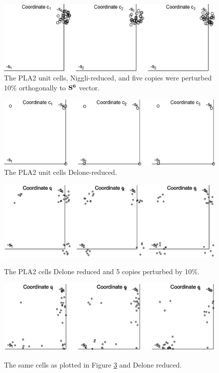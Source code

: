 \documentclass[]{iucr}              %
\numberwithin{equation}{section}
\newcommand{\SVI}[0]{$\bf{S^{6}}$}
\begin{document}
\begin{figure}
	\includegraphics[width=1.0\textwidth]{5_21}
	\caption{The PLA2 unit cells, Niggli-reduced, and five copies were perturbed 10\%
		orthogonally to \SVI{} vector. }
	\label{fig5}	
\end{figure}

	\begin{figure}
		\includegraphics[width=1.0\textwidth]{3_03}
		\caption{The PLA2 unit cells Delone-reduced. }
		\label{fig3}
	\end{figure}
	
	\begin{figure}
		\includegraphics[width=1.0\textwidth]{5_38}
		\label{5_38}
		\caption{The PLA2 cells Delone reduced and
		5 copies perturbed by 10\%.}
	\end{figure}
	
	\begin{figure}
		\includegraphics[width=1.0\textwidth]{6_53}
		\label{6_53}
		\caption{The same cells as plotted in Figure \ref{5_38} 
			and Delone reduced.}
	\end{figure}
	
\end{document}

